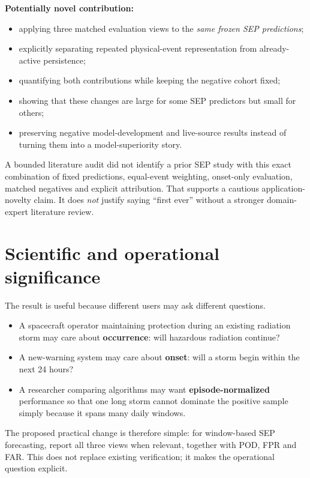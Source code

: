 \documentclass[11pt]{article}
\begin{document}
\textbf{Potentially novel contribution:}
\begin{itemize}
    \item applying three matched evaluation views to the \emph{same frozen SEP predictions};
    \item explicitly separating repeated physical-event representation from already-active persistence;
    \item quantifying both contributions while keeping the negative cohort fixed;
    \item showing that these changes are large for some SEP predictors but small for others;
    \item preserving negative model-development and live-source results instead of turning them into a model-superiority story.
\end{itemize}

A bounded literature audit did not identify a prior SEP study with this exact combination of fixed predictions, equal-event weighting, onset-only evaluation, matched negatives and explicit attribution. That supports a cautious application-novelty claim. It does \emph{not} justify saying ``first ever'' without a stronger domain-expert literature review.

\section{Scientific and operational significance}

The result is useful because different users may ask different questions.

\begin{itemize}
    \item A spacecraft operator maintaining protection during an existing radiation storm may care about \textbf{occurrence}: will hazardous radiation continue?
    \item A new-warning system may care about \textbf{onset}: will a storm begin within the next 24 hours?
    \item A researcher comparing algorithms may want \textbf{episode-normalized} performance so that one long storm cannot dominate the positive sample simply because it spans many daily windows.
\end{itemize}

The proposed practical change is therefore simple: for window-based SEP forecasting, report all three views when relevant, together with POD, FPR and FAR. This does not replace existing verification; it makes the operational question explicit.
\end{document}

